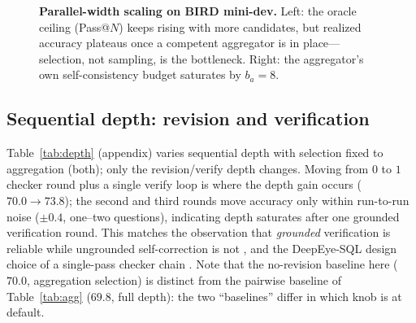 \documentclass{article}
\newcommand{\ex}{\textsc{ex}\xspace}
\begin{document}
\begin{figure}[t]
\centering
\begin{minipage}{0.49\textwidth}
\centering
{}
\end{minipage}\hfill
\begin{minipage}{0.49\textwidth}
\centering
{}
\end{minipage}
\caption{\textbf{Parallel-width scaling on BIRD mini-dev.} Left: the oracle ceiling (Pass@$N$) keeps rising with more candidates, but realized accuracy plateaus once a competent aggregator is in place---selection, not sampling, is the bottleneck. Right: the aggregator's own self-consistency budget saturates by $b_a\!=\!8$.}
\label{fig:scaling}
\end{figure}

\subsection{Sequential depth: revision and verification}
\label{sec:depth}

Table~\ref{tab:depth} (appendix) varies sequential depth with selection fixed to aggregation (both); only the revision/verify depth changes. Moving from $0$ to $1$ checker round plus a single verify loop is where the depth gain occurs ($70.0\!\rightarrow\!73.8$); the second and third rounds move accuracy only within run-to-run noise ($\pm0.4$, one--two questions), indicating depth saturates after one grounded verification round. This matches the observation that \emph{grounded} verification is reliable while ungrounded self-correction is not \citep{lee2026aggagent}, and the DeepEye-SQL design choice of a single-pass checker chain \citep{li2026deepeye}. Note that the no-revision baseline here ($70.0$, aggregation selection) is distinct from the pairwise baseline of Table~\ref{tab:agg} ($69.8$, full depth): the two ``baselines'' differ in which knob is at default.
\end{document}
